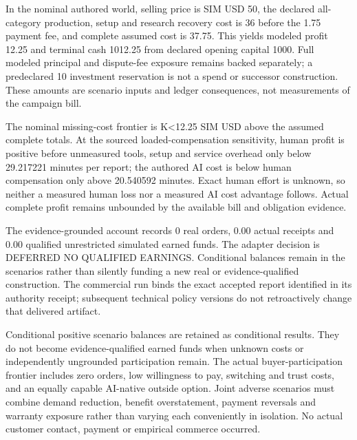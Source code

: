 \documentclass[10pt,letterpaper]{article}
\begin{document}
In the nominal authored world, selling price is SIM USD 50, the declared all-category production, setup and research recovery cost is 36 before the 1.75 payment fee, and complete assumed cost is 37.75. This yields modeled profit 12.25 and terminal cash 1012.25 from declared opening capital 1000. Full modeled principal and dispute-fee exposure remains backed separately; a predeclared 10 investment reservation is not a spend or successor construction. These amounts are scenario inputs and ledger consequences, not measurements of the campaign bill.\par
The nominal missing-cost frontier is K<12.25 SIM USD above the assumed complete totals. At the sourced loaded-compensation sensitivity, human profit is positive before unmeasured tools, setup and service overhead only below 29.217221 minutes per report; the authored AI cost is below human compensation only above 20.540592 minutes. Exact human effort is unknown, so neither a measured human loss nor a measured AI cost advantage follows. Actual complete profit remains unbounded by the available bill and obligation evidence.\par
The evidence-grounded account records 0 real orders, 0.00 actual receipts and 0.00 qualified unrestricted simulated earned funds. The adapter decision is DEFERRED NO QUALIFIED EARNINGS. Conditional balances remain in the scenarios rather than silently funding a new real or evidence-qualified construction. The commercial run binds the exact accepted report identified in its authority receipt; subsequent technical policy versions do not retroactively change that delivered artifact.\par
Conditional positive scenario balances are retained as conditional results. They do not become evidence-qualified earned funds when unknown costs or independently ungrounded participation remain. The actual buyer-participation frontier includes zero orders, low willingness to pay, switching and trust costs, and an equally capable AI-native outside option. Joint adverse scenarios must combine demand reduction, benefit overstatement, payment reversals and warranty exposure rather than varying each conveniently in isolation. No actual customer contact, payment or empirical commerce occurred.\par
\end{document}
